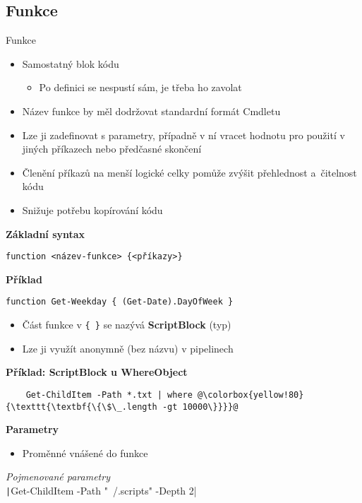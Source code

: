 \documentclass[main.tex]{subfiles}
\begin{document}
\subsection{Funkce}
\begin{frame}{Funkce}
  \begin{itemize}
    \item Samostatný blok kódu
      \begin{itemize}
        \item Po definici se nespustí sám, je třeba ho zavolat
      \end{itemize}
    \item Název funkce by měl dodržovat standardní formát Cmdletu
    \item Lze ji zadefinovat s parametry, případně v ní vracet hodnotu pro použití v jiných příkazech nebo předčasné skončení
    \item Členění příkazů na menší logické celky pomůže zvýšit přehlednost a~čitelnost kódu
    \item Snižuje potřebu kopírování kódu
  \end{itemize}
  \framebreak
\textbf{Základní syntax}
  \begin{verbatim}
function <název-funkce> {<příkazy>}
\end{verbatim}
\textbf{Příklad}
\begin{verbatim}
function Get-Weekday { (Get-Date).DayOfWeek }
\end{verbatim}
\vspace{3mm}
\begin{itemize}
  \item Část funkce v \texttt{\{ \}} se nazývá \textbf{ScriptBlock} (typ)
  \item Lze ji využít anonymně (bez názvu) v pipelinech
\end{itemize}
\textbf{Příklad: ScriptBlock u WhereObject}
  \begin{verbatim}
    Get-ChildItem -Path *.txt | where @\colorbox{yellow!80}{\texttt{\textbf{\{\$\_.length -gt 10000\}}}}@
\end{verbatim}
\framebreak
\textbf{Parametry}
\begin{itemize}
  \item Proměnné vnášené do funkce
\end{itemize}
  \textit{Pojmenované parametry}\\[2mm]
  \texttt|Get-ChildItem -Path "~/.scripts" -Depth 2|


\end{frame}
\end{document}
